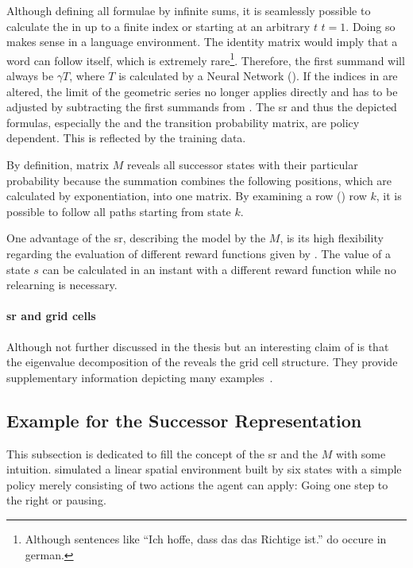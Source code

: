 Although defining all formulae by infinite sums, it is seamlessly possible to calculate the \srmat{} in \equref{\eqref{eq: sr or m via T}} up to a finite index or starting at an arbitrary $ t $ \ie $ t=1 $. Doing so makes sense in a language environment. The identity matrix would imply that a word can follow itself, which is extremely rare\footnote{Although sentences like ``Ich hoffe, dass das das Richtige ist.'' do occure in german.}. Therefore, the first summand will always be $ \gamma T $, where $ T $ is calculated by a Neural Network (). If the indices in \equref{\eqref{eq: sr or m via T}} are altered, the limit of the geometric series no longer applies directly and has to be adjusted by subtracting the first summands from \equref{\eqref{eq: geo series}}. The \gls{sr} and thus the depicted formulas, especially the \srmat{} and the transition probability matrix, are policy dependent. This is reflected by the training data.

By definition, matrix $ M $ reveals all successor states with their particular probability because the summation combines the following positions, which are calculated by exponentiation, into one matrix. By examining a row (\figref{\ref{fig: sr-spalte}}) \eg row $ k $, it is possible to follow all paths starting from state $ k $.

One advantage of the \gls{sr}, \ie describing the model by the \srmat{} $ M $, is its high flexibility regarding the evaluation of different reward functions given by \equref{\eqref{eq: v with sr-matrix}}. The value of a state $ s $ can be calculated in an instant with a different reward function while no relearning is necessary.

\paragraph{\gls{sr} and grid cells}
Although not further discussed in the thesis but an interesting claim of  is that the eigenvalue decomposition of the \srmat{} reveals the grid cell structure. They provide supplementary information depicting many examples~\cite{StBoGe17HPM}.


\subsection{Example for the Successor Representation}
This subsection is dedicated to fill the concept of the \gls{sr} and the \srmat{} $ M $ with some intuition.  simulated a linear spatial environment built by six states with a simple policy merely consisting of two actions the agent can apply: Going one step to the right or pausing.
%
